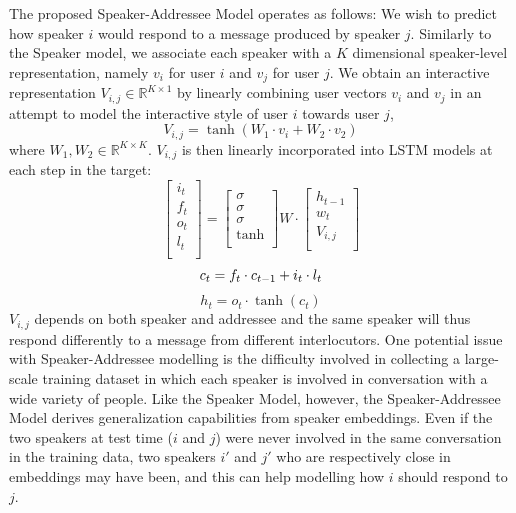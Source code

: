 The proposed Speaker-Addressee Model operates as follows:
We wish to predict how speaker $i$ would respond to a message produced by speaker $j$. Similarly to the Speaker model, we associate each speaker with a $K$ dimensional speaker-level representation, namely $v_i$ for user $i$ and $v_j$ for user $j$. 
We obtain an interactive representation $V_{i,j}\in \mathbb{R}^{K\times 1}$ by linearly combining user vectors $v_i$ and $v_j$
in an attempt to model the interactive style of user $i$ towards user $j$,
\begin{equation}
V_{i,j}=\tanh(W_1\cdot v_i+W_2\cdot v_2)
\end{equation}
where $W_1, W_2\in \mathbb{R}^{K\times K}$. 
$V_{i,j}$  is then linearly incorporated into LSTM models at each step in the target: 
\begin{equation}
\left[
\begin{array}{lr}
i_t\\
f_t\\
o_t\\
l_t\\
\end{array}
\right]=
\left[
\begin{array}{c}
\sigma\\
\sigma\\
\sigma\\
\tanh\\
\end{array}
\right]
W\cdot
\left[
\begin{array}{c}
h_{t-1}\\
w_{t}\\
V_{i,j}\\
\end{array}
\right]
\end{equation}
\begin{equation}
c_t=f_t\cdot c_{t-1}+i_t\cdot l_t\\
\end{equation}
\begin{equation}
h_{t}=o_t\cdot \tanh(c_t)
\end{equation}
$V_{i,j}$ 
depends on both speaker and addressee and
the same speaker will thus respond differently to a message from different interlocutors. 
One potential issue with Speaker-Addressee modelling is the difficulty involved in collecting a large-scale training dataset in which each speaker 
is involved in conversation with a wide variety of people. Like the Speaker Model, however, the Speaker-Addressee Model derives generalization capabilities from speaker embeddings.
Even if the two speakers
at test time ($i$ and $j$) were never involved in the same conversation in the training data, two speakers $i'$ and $j'$ who are respectively close in embeddings may have been, and this can help  modelling how $i$ should respond to $j$. 

